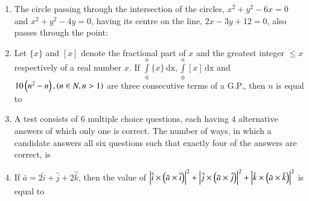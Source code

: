 \documentclass[journal]{IEEEtran}
\begin{document}
\begin{enumerate}[start=16]
\begin{enumerate}
\end{enumerate}

\item The circle passing through the intersection of the circles, $x^2+y^2-6x=0$ and $x^2+y^2-4y=0$, having its centre on the line, $2x-3y+12=0$, also passes through the point:
\begin{enumerate}
\end{enumerate}

\item Let $\{x\}$ and ${[x]}$ denote the fractional part of $x$ and the greatest integer $\leq x$ respectively of a real number $x$. If $\int\limits_0^n\{x\} \, \text{dx},\int\limits_0^n{[x]} \,\text{dx}$ and $10\left(n^2-n\right),\left(n \in N,n>1\right)$ are three consecutive terms of a G.P., then $n$ is equal to \underline{\hspace{1cm}}\\ 

\item A test consists of $6$ multiple choice questions, each having $4$ alternative answers of which only one is correct. The number of ways, in which a candidate answers all six questions such that exactly four of the answers are correct, is \underline{\hspace{1cm}}\\

\item If $\bar{a} = 2\hat{i} + \hat{j} + 2\hat{k}$, then the value of $\left\vert\hat{i} \times \left(\bar{a} \times \hat{i}\right)\right\vert^2 + \left\vert\hat{j} \times \left(\bar{a} \times \hat{j}\right)\right\vert^2 + \left\vert\hat{k} \times \left(\bar{a} \times \hat{k}\right)\right\vert^2$  is equal to \underline{\hspace{1cm}}\\


\end{enumerate}
\end{document}
